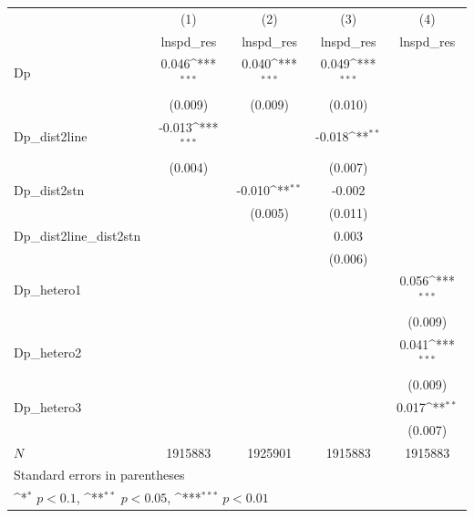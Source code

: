 {
\def\sym#1{\ifmmode^{#1}\else\(^{#1}\)\fi}
\begin{tabular}{l*{4}{c}}
\hline\hline
            &\multicolumn{1}{c}{(1)}&\multicolumn{1}{c}{(2)}&\multicolumn{1}{c}{(3)}&\multicolumn{1}{c}{(4)}\\
            &\multicolumn{1}{c}{lnspd\_res}&\multicolumn{1}{c}{lnspd\_res}&\multicolumn{1}{c}{lnspd\_res}&\multicolumn{1}{c}{lnspd\_res}\\
\hline
Dp          &       0.046\sym{***}&       0.040\sym{***}&       0.049\sym{***}&                     \\
            &     (0.009)         &     (0.009)         &     (0.010)         &                     \\
[1em]
Dp\_dist2line&      -0.013\sym{***}&                     &      -0.018\sym{**} &                     \\
            &     (0.004)         &                     &     (0.007)         &                     \\
[1em]
Dp\_dist2stn &                     &      -0.010\sym{**} &      -0.002         &                     \\
            &                     &     (0.005)         &     (0.011)         &                     \\
[1em]
Dp\_dist2line\_dist2stn&                     &                     &       0.003         &                     \\
            &                     &                     &     (0.006)         &                     \\
[1em]
Dp\_hetero1  &                     &                     &                     &       0.056\sym{***}\\
            &                     &                     &                     &     (0.009)         \\
[1em]
Dp\_hetero2  &                     &                     &                     &       0.041\sym{***}\\
            &                     &                     &                     &     (0.009)         \\
[1em]
Dp\_hetero3  &                     &                     &                     &       0.017\sym{**} \\
            &                     &                     &                     &     (0.007)         \\
\hline
\(N\)       &     1915883         &     1925901         &     1915883         &     1915883         \\
\hline\hline
\multicolumn{5}{l}{\footnotesize Standard errors in parentheses}\\
\multicolumn{5}{l}{\footnotesize \sym{*} \(p<0.1\), \sym{**} \(p<0.05\), \sym{***} \(p<0.01\)}\\
\end{tabular}
}
